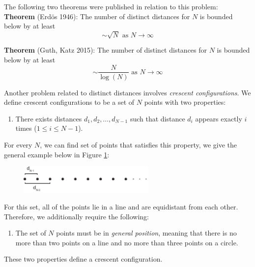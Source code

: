 \documentclass[12pt]{article}
\begin{document}
\noindent The following two theorems were published in relation to this problem: \\

\noindent \textbf{Theorem} (Erd\"os 1946): The number of distinct distances for $N$ is bounded below by at least
$$\sim \sqrt{N} \text{ as } N \rightarrow \infty$$

\noindent \textbf{Theorem} (Guth, Katz 2015): The number of distinct distances for $N$ is bounded below by at least
$$\sim \frac{N}{\log(N)} \text{ as } N \rightarrow \infty$$

\noindent Another problem related to distinct distances involves \textit{crescent configurations}. We define crescent configurations to be a set of $N$ points with two properties:

\begin{enumerate}[itemsep=0pt,parsep=0pt,partopsep=0pt, topsep=0pt]
\item There exists distances $d_1, d_2, \dots, d_{N-1}$ such that distance $d_i$ appears exactly $i$ times ($1 \leq i \leq N-1$). \\
\end{enumerate}

\noindent For every $N$, we can find set of points that satisfies this property, we give the general example below in Figure \ref{linear}:

\begin{figure}[H]
\centering
\includegraphics[width=0.6\textwidth]{1CrescentConfigurationLinear.pdf}
\caption{}
\label{linear}
\end{figure}

\noindent For this set, all of the points lie in a line and are equidistant from each other. Therefore, we additionally require the following: \\

\begin{enumerate}[itemsep=0pt,parsep=0pt,partopsep=0pt, topsep=0pt]
\addtocounter{enumi}{1}
\item The set of $N$ points must be in \textit{general position}, meaning that there is no more than two points on a line and no more than three points on a circle. \\
\end{enumerate}

\noindent These two properties define a crescent configuration.  \\
\end{document}
